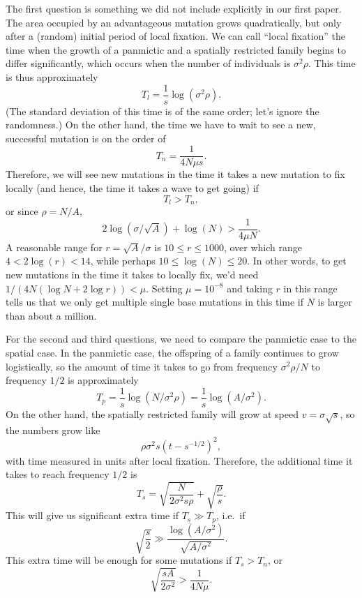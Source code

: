 \documentclass{article}
\begin{document}
The first question is something we did not include explicitly in our first paper.
The area occupied by an advantageous mutation grows quadratically, 
but only after a (random) initial period of local fixation.
We can call ``local fixation'' 
the time when the growth of a panmictic and a spatially restricted family
begins to differ significantly,
which occurs when the number of individuals is $\sigma^2 \rho$.
This time is thus approximately
\[
  T_l = \frac{1}{s} \log (\sigma^2 \rho) .
\]
(The standard deviation of this time is of the same order; let's ignore the randomness.)
On the other hand, the time we have to wait to see a new, successful mutation is on the order of
\[
  T_n = \frac{1}{4N\mu s} .
\]
Therefore, we will see new mutations in the time it takes a new mutation to fix locally
(and hence, the time it takes a wave to get going)
if
\[
    T_l > T_n ,
\]
or since $\rho = N/A$,
\begin{equation} \label{eqn:tlggtn}
  2 \log(\sigma / \sqrt{A}) + \log(N) > \frac{1}{4\mu N} .
\end{equation}
A reasonable range for $r=\sqrt{A}/\sigma$ is $10 \le r \le 1000$,
over which range $4 < 2\log(r) < 14$, while perhaps $10 \le \log(N) \le 20$.
In other words, to get new mutations in the time it takes to locally fix,
we'd need $1/(4 N (\log N + 2 \log r)) < \mu$.
Setting $\mu=10^{-8}$ and taking $r$ in this range
tells us that we only get multiple single base mutations in this time 
if $N$ is larger than about a million.


For the second and third questions,
we need to compare the panmictic case to the spatial case.
In the panmictic case, the offspring of a family continues to grow logistically,
so the amount of time it takes to go from frequency $\sigma^2 \rho / N$ to frequency $1/2$ 
is approximately
\[
  T_p = \frac{1}{s} \log (N/\sigma^2 \rho) = \frac{1}{s} \log(A/\sigma^2) .
\]
On the other hand, the spatially restricted family will grow at speed $v=\sigma \sqrt{s}$, 
so the numbers grow like
\[
  \rho \sigma^2 s \left(t - s^{-1/2} \right)^2,
\]
with time measured in units after local fixation.
Therefore, the additional time it takes to reach frequency $1/2$ is 
\[
T_s = \sqrt{\frac{N}{2\sigma^2 s \rho}} + \sqrt{\frac{\rho}{s}} .
\]
This will give us significant extra time if $T_s \gg T_p$, i.e.\ if
\begin{equation} \label{eqn:tsggtp}
  \sqrt{\frac{s}{2}} \gg \frac{ \log(A/\sigma^2) }{ \sqrt{A/\sigma^2} }. %
\end{equation}
This extra time will be enough for some mutations if $T_s > T_n$, or
\begin{equation}
  \sqrt{\frac{sA}{2\sigma^2}} > \frac{1}{4N\mu} .
\end{equation}
\end{document}
